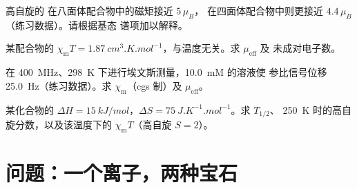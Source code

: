 \begin{exercise}[$\star\star$]\label{exo:b3:complex-spectra-magnetism:9}
高自旋的  在八面体配合物中的磁矩接近 $5\,\mu_B$，
在四面体配合物中则更接近 $4.4\,\mu_B$（练习数据）。请根据基态
谱项加以解释。
\end{exercise}

\begin{exercise}[$\star\star\star$]\label{exo:b3:complex-spectra-magnetism:10}
某配合物的 $\chi_{\mathrm m}T = \qty{1.87}{cm^3.K.mol^{-1}}$，与温度无关。求 $\mu_{\mathrm{eff}}$ 及
未成对电子数。
\end{exercise}

\begin{exercise}[$\star\star\star$]\label{exo:b3:complex-spectra-magnetism:11}
在 \qty{400}{MHz}、\qty{298}{K} 下进行埃文斯测量，\qty{10.0}{mM} 的溶液使
参比信号位移 \qty{25.0}{Hz}（练习数据）。求 $\chi_{\mathrm m}$（cgs 制）及 $\mu_{\mathrm{eff}}$。
\end{exercise}

\begin{exercise}[$\star\star\star$]\label{exo:b3:complex-spectra-magnetism:12}
某化合物的 $\Delta H = \qty{15}{kJ/mol}$，$\Delta S = \qty{75}{J.K^{-1}.mol^{-1}}$。求 $T_{1/2}$、
\qty{250}{K} 时的高自旋分数，以及该温度下的 $\chi_{\mathrm m}T$（高自旋 $S = 2$）。
\end{exercise}

\section{问题：一个离子，两种宝石}

